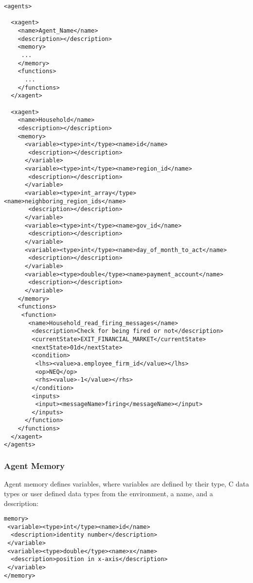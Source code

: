 \begin{mylisting}
\begin{verbatim}
<agents>

  <xagent>
    <name>Agent_Name</name>
    <description></description>
    <memory>
     ...
    </memory>
    <functions>
      ...
    </functions>
  </xagent>

  <xagent>
    <name>Household</name>
    <description></description>
    <memory>
      <variable><type>int</type><name>id</name>
       <description></description>
      </variable>
      <variable><type>int</type><name>region_id</name>
       <description></description>
      </variable>
      <variable><type>int_array</type><name>neighboring_region_ids</name>
       <description></description>
      </variable>
      <variable><type>int</type><name>gov_id</name>
       <description></description>
      </variable>
      <variable><type>int</type><name>day_of_month_to_act</name>
       <description></description>
      </variable>
      <variable><type>double</type><name>payment_account</name>
       <description></description>
      </variable>
    </memory>
    <functions>
     <function>
       <name>Household_read_firing_messages</name>
        <description>Check for being fired or not</description>
        <currentState>EXIT_FINANCIAL_MARKET</currentState>
        <nextState>01d</nextState>
        <condition>
         <lhs><value>a.employee_firm_id</value></lhs>
         <op>NEQ</op>
         <rhs><value>-1</value></rhs>
        </condition>
        <inputs>
         <input><messageName>firing</messageName></input>
        </inputs>
      </function>
    </functions>
  </xagent>
</agents>
\end{verbatim}
\end{mylisting}

\subsubsection{Agent Memory}

Agent memory defines variables, where variables are defined by their type, C
data types or user defined data types from the environment, a name, and a
description:

\begin{mylisting}
\begin{verbatim}
memory>
 <variable><type>int</type><name>id</name>
  <description>identity number</description>
 </variable>
 <variable><type>double</type><name>x</name>
  <description>position in x-axis</description>
 </variable>
</memory>
\end{verbatim}
\end{mylisting}

